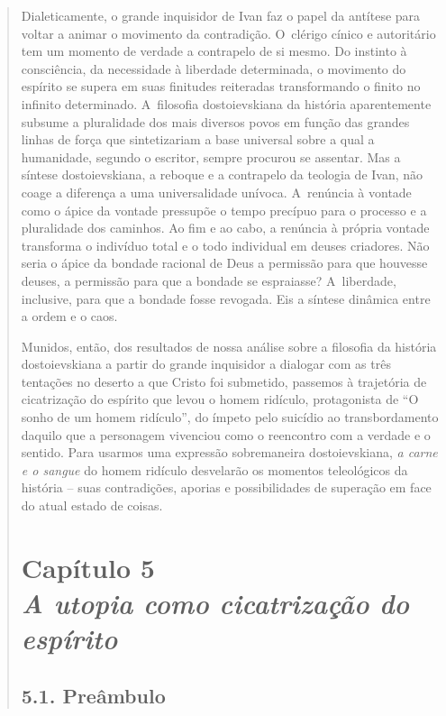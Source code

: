 {\begin{quote}
Dialeticamente, o grande inquisidor de Ivan faz o papel da antítese para
voltar a animar o movimento da contradição. O~clérigo cínico e
autoritário tem um momento de verdade a contrapelo de si mesmo. Do
instinto à consciência, da necessidade à liberdade determinada, o
movimento do espírito se supera em suas finitudes reiteradas
transformando o finito no infinito determinado. A~filosofia
dostoievskiana da história aparentemente subsume a pluralidade dos mais
diversos povos em função das grandes linhas de força que sintetizariam a
base universal sobre a qual a humanidade, segundo o escritor, sempre
procurou se assentar. Mas a síntese dostoievskiana, a reboque e a
contrapelo da teologia de Ivan, não coage a diferença a uma
universalidade unívoca. A~renúncia à vontade como o ápice da vontade
pressupõe o tempo precípuo para o processo e a pluralidade dos caminhos.
Ao fim e ao cabo, a renúncia à própria vontade transforma o indivíduo
total e o todo individual em deuses criadores. Não seria o ápice da
bondade racional de Deus a permissão para que houvesse deuses, a
permissão para que a bondade se espraiasse? A~liberdade, inclusive, para
que a bondade fosse revogada. Eis a síntese dinâmica entre a ordem e o
caos.

Munidos, então, dos resultados de nossa análise sobre a filosofia da
história dostoievskiana a partir do grande inquisidor a dialogar com as
três tentações no deserto a que Cristo foi submetido, passemos à
trajetória de cicatrização do espírito que levou o homem ridículo,
protagonista de ``O sonho de um homem ridículo'', do ímpeto pelo
suicídio ao transbordamento daquilo que a personagem vivenciou como o
reencontro com a verdade e o sentido. Para usarmos uma expressão
sobremaneira dostoievskiana, \emph{a carne e o sangue} do homem ridículo
desvelarão os momentos teleológicos da história -- suas contradições,
aporias e possibilidades de superação em face do atual estado de coisas.

\chapter*{Capítulo 5\\
\bigskip
\emph{A utopia como cicatrização do espírito}}


\section{5.1. Preâmbulo}


\end{quote}}
